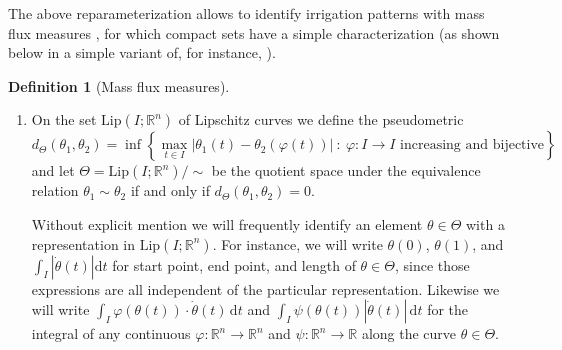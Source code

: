 \documentclass[10pt,a4paper,oneside,final]{article}
\newcommand{\R}{{\mathbb{R}}}
\newcommand{\de}{{\mathrm{d}}}
\newcommand{\Lip}{\mathrm{Lip}}
\newcommand{\transportPath}{mass flux}
\newcommand{\TransportPath}{Mass flux}
\numberwithin{equation}{section}
\theoremstyle{plain}
\theoremstyle{definition}
\newtheorem{definition}[theorem]{Definition}
\theoremstyle{remark}
\begin{document}
The above reparameterization allows to identify irrigation patterns with \transportPath{} measures \cite[Def.\,2.5]{BuPrSoSt09}, for which compact sets have a simple characterization (as shown below in a simple variant of, for instance, \cite[Lem.\,4.3.5]{BrWi15-equivalent}).

\begin{definition}[\TransportPath{} measures]\label{def:transport_path_measures}
\begin{enumerate}
\item On the set $\Lip(I;\R^n)$ of Lipschitz curves we define the pseudometric
\begin{equation*}
d_\Theta(\theta_1,\theta_2)=\inf\left\{\max_{t\in I}|\theta_1(t)-\theta_2(\varphi(t))|\ :\ \varphi:I\to I\text{ increasing and bijective}\right\}
\end{equation*}
and let $\Theta=\Lip(I;\R^n)/\sim$ be the quotient space under the equivalence relation $\theta_1\sim\theta_2$ if and only if $d_\Theta(\theta_1,\theta_2)=0$.

Without explicit mention we will frequently identify an element $\theta\in\Theta$ with a representation in $\Lip(I;\R^n)$.
For instance, we will write $\theta(0)$, $\theta(1)$, and $\int_I |\dot\theta(t)|\de t$ for start point, end point, and length of $\theta\in\Theta$,
since those expressions are all independent of the particular representation.
Likewise we will write $\int_I\varphi(\theta(t))\cdot\dot\theta(t)\,\de t$ and $\int_I\psi(\theta(t))|\dot\theta(t)|\,\de t$ for the integral of any continuous $\varphi:\R^n\to\R^n$ and $\psi:\R^n\to\R$ along the curve $\theta\in\Theta$.


\end{enumerate}
\end{definition}
\end{document}
